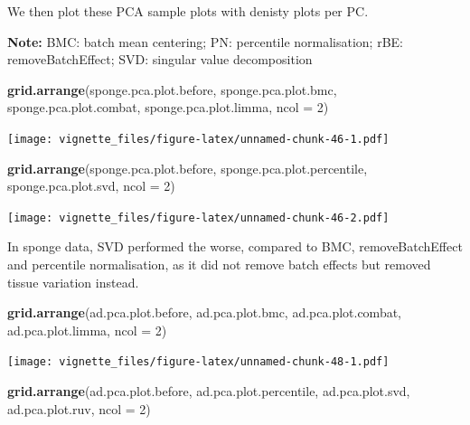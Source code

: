 \documentclass[]{book}
\newenvironment{Shaded}{\begin{snugshade}}{\end{snugshade}}
\newcommand{\KeywordTok}[1]{\textcolor[rgb]{0.13,0.29,0.53}{\textbf{#1}}}
\newcommand{\DataTypeTok}[1]{\textcolor[rgb]{0.13,0.29,0.53}{#1}}
\newcommand{\DecValTok}[1]{\textcolor[rgb]{0.00,0.00,0.81}{#1}}
\newcommand{\NormalTok}[1]{#1}
\begin{document}
We then plot these PCA sample plots with denisty plots per PC.

\textbf{Note:} BMC: batch mean centering; PN: percentile normalisation;
rBE: removeBatchEffect; SVD: singular value decomposition

\begin{Shaded}
\begin{Highlighting}[]
\KeywordTok{grid.arrange}\NormalTok{(sponge.pca.plot.before, sponge.pca.plot.bmc, }
\NormalTok{             sponge.pca.plot.combat, sponge.pca.plot.limma, }\DataTypeTok{ncol =} \DecValTok{2}\NormalTok{)}
\end{Highlighting}
\end{Shaded}

\texttt{[image: vignette\_files/figure-latex/unnamed-chunk-46-1.pdf]}

\begin{Shaded}
\begin{Highlighting}[]
\KeywordTok{grid.arrange}\NormalTok{(sponge.pca.plot.before, sponge.pca.plot.percentile, }
\NormalTok{             sponge.pca.plot.svd, }\DataTypeTok{ncol =} \DecValTok{2}\NormalTok{)}
\end{Highlighting}
\end{Shaded}

\texttt{[image: vignette\_files/figure-latex/unnamed-chunk-46-2.pdf]}

In sponge data, SVD performed the worse, compared to BMC,
removeBatchEffect and percentile normalisation, as it did not remove
batch effects but removed tissue variation instead.

\begin{Shaded}
\begin{Highlighting}[]
\KeywordTok{grid.arrange}\NormalTok{(ad.pca.plot.before, ad.pca.plot.bmc, }
\NormalTok{             ad.pca.plot.combat, ad.pca.plot.limma, }\DataTypeTok{ncol =} \DecValTok{2}\NormalTok{)}
\end{Highlighting}
\end{Shaded}

\texttt{[image: vignette\_files/figure-latex/unnamed-chunk-48-1.pdf]}

\begin{Shaded}
\begin{Highlighting}[]
\KeywordTok{grid.arrange}\NormalTok{(ad.pca.plot.before, ad.pca.plot.percentile, }
\NormalTok{             ad.pca.plot.svd, ad.pca.plot.ruv, }\DataTypeTok{ncol =} \DecValTok{2}\NormalTok{)}
\end{Highlighting}
\end{Shaded}
\end{document}
